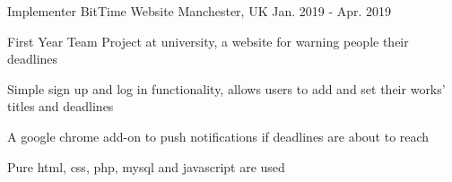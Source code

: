 \begin{cventries}
  \cventry
    {Implementer} %
    {BitTime Website} %
    {Manchester, UK} %
    {Jan. 2019 - Apr. 2019} %
    {
      \begin{cvitems} %
        \item {First Year Team Project at university, a website for warning people their deadlines}
        \item {Simple sign up and log in functionality, allows users to add and set their works' titles         and deadlines}
        \item {A google chrome add-on to push notifications if deadlines are about to reach}
        \item {Pure html, css, php, mysql and javascript are used}
      \end{cvitems}
    }


\end{cventries}
